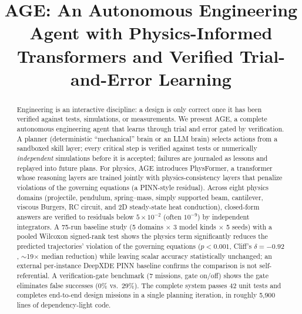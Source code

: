 \documentclass[conference,10pt]{IEEEtran}
\begin{document}
\title{AGE: An Autonomous Engineering Agent with Physics-Informed Transformers and Verified Trial-and-Error Learning}

\author{
}

\maketitle

\begin{abstract}
Engineering is an interactive discipline: a design is only correct once it has
been verified against tests, simulations, or measurements. We present AGE, a
complete autonomous engineering agent that learns through trial and error
gated by verification. A planner (deterministic ``mechanical'' brain or an
LLM brain) selects actions from a sandboxed skill layer; every critical step
is verified against tests or numerically \emph{independent} simulations
before it is accepted; failures are journaled as lessons and replayed into
future plans. For physics, AGE introduces PhysFormer, a transformer whose
reasoning layers are trained jointly with physics-consistency layers that
penalize violations of the governing equations (a PINN-style residual).
Across eight physics domains (projectile, pendulum, spring--mass, simply
supported beam, cantilever, viscous Burgers, RC circuit, and 2D steady-state
heat conduction), closed-form answers are verified to residuals below
$5\times10^{-2}$ (often $10^{-9}$) by independent integrators. A 75-run
baseline study (5 domains $\times$ 3 model kinds $\times$ 5 seeds) with a
pooled Wilcoxon signed-rank test shows the physics term significantly
reduces the predicted trajectories' violation of the governing equations
($p<0.001$, Cliff's $\delta=-0.92$, $\sim$19$\times$ median reduction) while
leaving scalar accuracy statistically unchanged; an external per-instance
DeepXDE PINN baseline confirms the comparison is not self-referential. A
verification-gate benchmark (7 missions, gate on/off) shows the gate
eliminates false successes (0\% vs.\ 29\%). The complete system passes 42
unit tests and completes end-to-end design missions in a single planning
iteration, in roughly 5,900 lines of dependency-light code.
\end{abstract}
\end{document}
